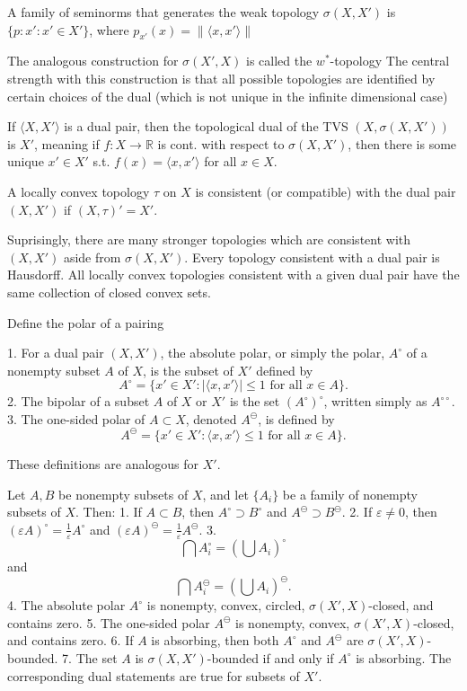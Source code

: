A family of seminorms that generates the weak
topology \( \sigma(X, X') \) is \( \{p : x' : x' \in X'\} \), where
\( p_{x'}(x) = \|\langle x, x' \rangle\| \)

The analogous construction for \( \sigma(X', X) \) is called the \( w^\ast \)-topology
The central strength with this construction is that all possible topologies are identified by certain choices of the dual
(which is not unique in the infinite dimensional case)

If \( \langle X, X' \rangle \) is a dual pair, then
the topological dual of the TVS \( (X, \sigma(X, X')) \) is \( X' \), meaning
if \( f : X \to \mathbb{R} \) is cont. with respect to \( \sigma(X, X') \), then there is some unique
\( x' \in X' \) s.t. \( f(x) = \langle x, x' \rangle \) for all \( x \in X \).

A locally convex topology \( \tau \) on \( X \) is consistent (or compatible)
with the dual pair \( (X, X') \) if \( (X, \tau)' = X' \). 

Suprisingly, there are many stronger topologies which are consistent with \( (X, X') \) aside from \( \sigma(X, X') \).
Every topology consistent with a dual pair is Hausdorff.
All locally convex topologies consistent with a given dual pair have the same collection of closed convex sets.


Define the polar of a pairing

1. For a dual pair \((X, X')\), the absolute polar, or simply the polar, \(A^{\circ}\) of a nonempty subset \(A\) of \(X\), 
is the subset of \(X'\) defined by  
\[
A^{\circ} = \{ x' \in X' : \left| \langle x, x' \rangle \right| \leq 1 \text{ for all } x \in A \}.
\]
2. The bipolar of a subset \(A\) of \(X\) or \(X'\) is the set \((A^{\circ})^{\circ}\), written simply as \(A^{\circ \circ}\).  
3. The one-sided polar of \(A \subset X\), denoted \(A^{\ominus}\), is defined by  
\[
A^{\ominus} = \{ x' \in X' : \langle x, x' \rangle \leq 1 \text{ for all } x \in A \}.
\]

These definitions are analogous for \( X' \).

Let \(A, B\) be nonempty subsets of \(X\), and let \(\{A_i\}\) be a family of nonempty subsets of \(X\). Then:
1. If \(A \subset B\), then \(A^{\circ} \supset B^{\circ}\) and \(A^{\ominus} \supset B^{\ominus}\).
2. If \(\varepsilon \neq 0\), then \((\varepsilon A)^{\circ} = \frac{1}{\varepsilon} A^{\circ}\) and \((\varepsilon A)^{\ominus} = \frac{1}{\varepsilon} A^{\ominus}\).
3.
\[
\bigcap A_i^{\circ} = \left(\bigcup A_i\right)^{\circ}
\]
and
\[
\bigcap A_i^{\ominus} = \left(\bigcup A_i\right)^{\ominus}.
\]
4. The absolute polar \(A^{\circ}\) is nonempty, convex, circled, \(\sigma(X', X)\)-closed, and contains zero.
5. The one-sided polar \(A^{\ominus}\) is nonempty, convex, \(\sigma(X', X)\)-closed, and contains zero.
6. If \(A\) is absorbing, then both \(A^{\circ}\) and \(A^{\ominus}\) are \(\sigma(X', X)\)-bounded.
7. The set \(A\) is \(\sigma(X, X')\)-bounded if and only if \(A^{\circ}\) is absorbing.
The corresponding dual statements are true for subsets of \(X'\).


